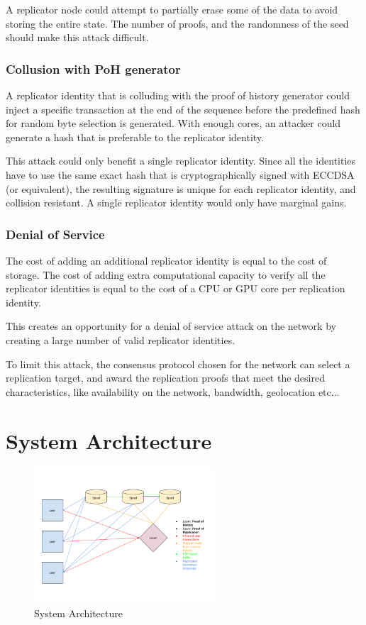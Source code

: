 \documentclass[12pt]{article}
\begin{document}
A replicator node could attempt to partially erase some of the data to avoid storing the entire state. The number of proofs, and the randomness of the seed should make this attack difficult.

\subsubsection{Collusion with PoH generator}

A replicator identity that is colluding with the proof of history generator could inject a specific transaction at the end of the sequence before the predefined hash for random byte selection is generated. With enough cores, an attacker could generate a hash that is preferable to the replicator identity.

This attack could only benefit a single replicator identity. Since all the identities have to use the same exact hash that is cryptographically signed with ECCDSA (or equivalent), the resulting signature is unique for each replicator identity, and collision resistant. A single replicator identity would only have marginal gains.
\subsubsection{Denial of Service}
The cost of adding an additional replicator identity is equal to the cost of storage. The cost of adding extra computational capacity to verify all the replicator identities is equal to the cost of a CPU or GPU core per replication identity.

This creates an opportunity for a denial of service attack on the network by creating a large number of valid replicator identities.

To limit this attack, the consensus protocol chosen for the network can select a replication target, and award the replication proofs that meet the desired characteristics, like availability on the network, bandwidth, geolocation etc...
\section{System Architecture}\label{system_architecture}

\begin{figure}
  \begin{center}
    \centering
    \includegraphics[width=0.6\textwidth]{figures/fig_9.png}
    \caption[Fig 9]{System Architecture \label{fig_9}}
  \end{center}
  \end{figure}
\end{document}
